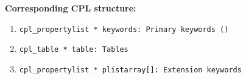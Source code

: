 \begin{datastructdef}
\textbf{Corresponding \ac{CPL} structure:}
\begin{enumerate}
    \item \texttt{cpl\_propertylist * keywords: Primary keywords (\hyperref[fits:pro.catg]{})}
    \item \texttt{cpl\_table * table: Tables}
    \item \texttt{cpl\_propertylist * plistarray[]: Extension keywords}
\end{enumerate}
\end{datastructdef}

